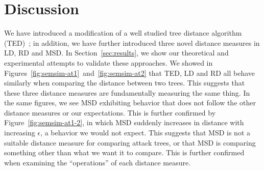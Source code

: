 
\section{Discussion}
\label{sec:discussion}








We have introduced a modification of a well studied tree distance algorithm (TED)~\cite{Zhang_Shasha_1989}; in addition, we have further introduced three novel distance measures in LD, RD and MSD. In Section~\ref{sec:results}, we show our theoretical and experimental attempts to validate these approaches. We showed in Figures~\ref{fig:semsim-at1}~and~\ref{fig:semsim-at2} that TED, LD and RD all behave similarly when comparing the distance between two trees. This suggests that these three distance measures are fundamentally measuring the same thing. In the same figures, we see MSD exhibiting behavior that does not follow the other distance measures or our expectations. This is further confirmed by Figure~\ref{fig:semsim-at1-2}, in which MSD suddenly increases in distance with increasing $\epsilon$, a behavior we would not expect.
This suggests that MSD is not a suitable distance measure for comparing attack trees, or that MSD is comparing something other than what we want it to compare. This is further confirmed when examining the ``operations'' of each distance measure.


